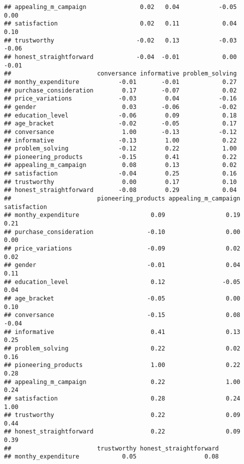 \documentclass[
]{article}
\begin{document}
\begin{verbatim}
## appealing_m_campaign               0.02   0.04           -0.05        0.00
## satisfaction                       0.02   0.11            0.04        0.10
## trustworthy                       -0.02   0.13           -0.03       -0.06
## honest_straightforward            -0.04  -0.01            0.00       -0.01
##                        conversance informative problem_solving
## monthy_expenditure           -0.01       -0.01            0.27
## purchase_consideration        0.17       -0.07            0.02
## price_variations             -0.03        0.04           -0.16
## gender                        0.03       -0.06           -0.02
## education_level              -0.06        0.09            0.18
## age_bracket                  -0.02       -0.05            0.17
## conversance                   1.00       -0.13           -0.12
## informative                  -0.13        1.00            0.22
## problem_solving              -0.12        0.22            1.00
## pioneering_products          -0.15        0.41            0.22
## appealing_m_campaign          0.08        0.13            0.02
## satisfaction                 -0.04        0.25            0.16
## trustworthy                   0.00        0.17            0.10
## honest_straightforward       -0.08        0.29            0.04
##                        pioneering_products appealing_m_campaign satisfaction
## monthy_expenditure                    0.09                 0.19         0.21
## purchase_consideration               -0.10                 0.00         0.00
## price_variations                     -0.09                 0.02         0.02
## gender                               -0.01                 0.04         0.11
## education_level                       0.12                -0.05         0.04
## age_bracket                          -0.05                 0.00         0.10
## conversance                          -0.15                 0.08        -0.04
## informative                           0.41                 0.13         0.25
## problem_solving                       0.22                 0.02         0.16
## pioneering_products                   1.00                 0.22         0.28
## appealing_m_campaign                  0.22                 1.00         0.24
## satisfaction                          0.28                 0.24         1.00
## trustworthy                           0.22                 0.09         0.44
## honest_straightforward                0.22                 0.09         0.39
##                        trustworthy honest_straightforward
## monthy_expenditure            0.05                   0.08

\end{verbatim}
\end{document}
